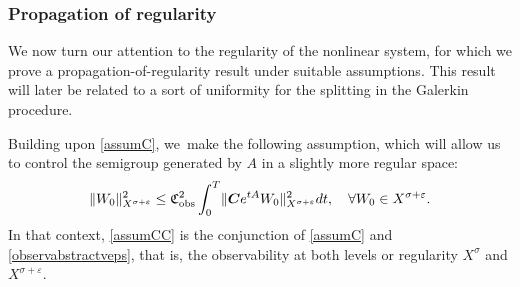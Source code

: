 \documentclass[JEP,XML,SOM,Unicode,published]{cedram}
\theoremstyle{definition}
\let\veps\varepsilon
\newcommand{\bC}{\boldsymbol{C}}
\providecommand{\norm}[1]{\lVert#1\rVert}
\begin{document}
\subsubsection{Propagation of regularity} We now turn our attention to the regularity of the nonlinear system, for which we prove a propagation-of-regularity result under suitable assumptions. This result will later be related to a sort of uniformity for the splitting in the Galerkin procedure.

Building upon \cref{assumC}, we~make the following assumption, which will allow us to control the semigroup generated by $A$ in a slightly more regular space:
\begin{align}\label{observabstractveps}
\norm{W_0}_{X^{\sigma+\veps}}^2\leq \mathfrak{C}_{\textup{obs}}^2\int_0^T \norm{\bC e^{tA}W_0}_{X^{\sigma+\veps}}^2dt,\quad \forall W_0\in X^{\sigma+\veps}.
\end{align}
In that context, \cref{assumCC} is the conjunction of \cref{assumC} and \eqref{observabstractveps}, that is, the observability at both levels or regularity $X^{\sigma}$ and $X^{\sigma+\veps}$.
\end{document}
